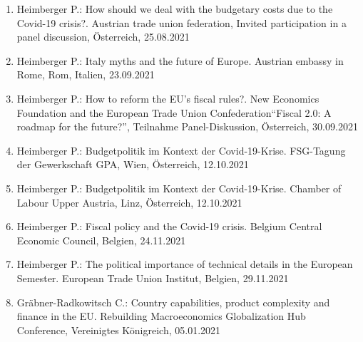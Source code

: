 \begin{enumerate}
	\item Heimberger P.: How should we deal with the budgetary costs due to the Covid-19 crisis?. Austrian trade union federation, Invited participation in a panel discussion, Österreich, 25.08.2021
	\item Heimberger P.: Italy myths and the future of Europe. Austrian embassy in Rome, Rom, Italien, 23.09.2021
	\item Heimberger P.: How to reform the EU’s fiscal rules?. New Economics Foundation and the European Trade Union Confederation“Fiscal 2.0: A roadmap for the future?”, Teilnahme Panel-Diskussion, Österreich, 30.09.2021
	\item Heimberger P.: Budgetpolitik im Kontext der Covid-19-Krise. FSG-Tagung der Gewerkschaft GPA, Wien, Österreich, 12.10.2021
	\item Heimberger P.: Budgetpolitik im Kontext der Covid-19-Krise. Chamber of Labour Upper Austria, Linz, Österreich, 12.10.2021
	\item Heimberger P.: Fiscal policy and the Covid-19 crisis. Belgium Central Economic Council, Belgien, 24.11.2021
	\item Heimberger P.: The political importance of technical details in the European Semester. European Trade Union Institut, Belgien, 29.11.2021
	\item Gräbner-Radkowitsch C.: Country capabilities, product complexity and finance in the EU. Rebuilding Macroeconomics Globalization Hub Conference, Vereinigtes Königreich, 05.01.2021
\end{enumerate}
